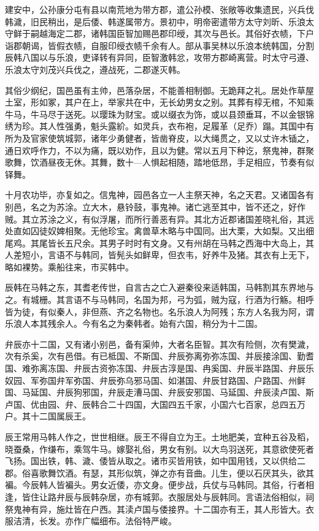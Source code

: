 \documentclass[12pt,UTF8]{ctexbook}
\begin{document}
建安中，公孙康分屯有县以南荒地为带方郡，遣公孙模、张敞等收集遗民，兴兵伐韩濊，旧民稍出，是后倭、韩遂属带方。景初中，明帝密遣带方太守刘昕、乐浪太守鲜于嗣越海定二郡，诸韩国臣智加赐邑郡印绶，其次与邑长。其俗好衣帻，下户诣郡朝谒，皆假衣帻，自服印绶衣帻千余有人。部从事吴林以乐浪本统韩国，分割辰韩八国以与乐浪，吏译转有异同，臣智激韩忿，攻带方郡崎离营。时太守弓遵、乐浪太守刘茂兴兵伐之，遵战死，二郡遂灭韩。

其俗少纲纪，国邑虽有主帅，邑落杂居，不能善相制御。无跪拜之礼。居处作草屋土室，形如冢，其户在上，举家共在中，无长幼男女之别。其葬有椁无棺，不知乘牛马，牛马尽于送死。以璎珠为财宝。或以缀衣为饰，或以县颈垂耳，不以金银锦绣为珍。其人性强勇，魁头露紒。如灵兵，衣布袍，足履革（足乔）蹋。其国中有所为及官家使筑城郭，诸年少勇健者，皆凿脊皮，以大绳贯之，又以丈许木锸之，通日欢呼作力，不以为痛，既以劝作，且以为健。常以五月下种讫，祭鬼神，群聚歌舞，饮酒昼夜无休。其舞，数十—人惧起相随，踏地低昂，手足相应，节奏有似铎舞。

十月农功毕，亦复如之。信鬼神，园邑各立一人主祭天神，名之天君。又诸国各有别邑，名之为苏涂。立大木，悬铃鼓，事鬼神。诸亡逃至其中，皆不还之，好作贼。其立苏涂之义，有似浮屠，而所行善恶有异。其北方近郡诸国差晓礼俗，其远处直如囚徒奴婢相聚。无他珍宝。禽兽草木略与中国同。出大栗，大如梨。又出细尾鸡。其尾皆长五尺余。其男子时时有文身。又有州胡在马韩之西海中大岛上，其人差短小，言语不与韩同，皆髡头如鲜卑，但衣韦，好养牛及猪。其衣有上无下，略如裸势。乘船往来，市买韩中。

辰韩在马韩之东，其耆老传世，自言古之亡入避秦役来适韩国，马韩割其东界地与之。有城栅。其言语不与马韩同，名国为邦，弓为弧，贼为寇，行酒为行觞。相呼皆为徒，有似秦人，非但燕、齐之名物也。名乐浪人为阿残；东方人名我为阿，谓乐浪人本其残余人。今有名之为秦韩者。始有六国，稍分为十二国。

弁辰亦十二国，又有诸小别邑，备有渠帅，大者名臣智。其次有险侧，次有樊濊，次有杀奚，次有邑借。有已柢国、不斯国、弁辰弥离弥弥冻国、并辰接涂国、勤耆国、难弥离冻国、弁辰古资弥冻国、弁辰古淳是国、冉奚国、弁辰半路国、弁辰乐奴园、军弥国弁军弥国、弁辰弥乌邪马国、如湛国、弁辰甘路国、户路国、州鲜国、马延国、弁辰狗邪国，弁辰走漕马国、弁辰安邪国、马延国、弁辰渎卢国、斯卢国、优由园、弁、辰韩合二十四国，大国四五千家，小国六七百家，总四五万户。其十二国属辰王。

辰王常用马韩人作之，世世相继。辰王不得自立为王。土地肥美，宜种五谷及稻，晓蚕桑，作缣布，乘驾牛马。嫁娶礼俗，男女有别。以大鸟羽送死，其意欲使死者飞扬。国出铁，韩、濊、倭皆从取之。诸市买皆用铁，如中国用钱，又以供给二郡。俗喜歌舞饮酒。有瑟，其形似筑，弹之亦有音曲。儿生，便以石厌其头，欲其褊。今辰韩人皆褊头。男女近倭，亦文身。便步战，兵仗与马韩同。其俗，行者相逢，皆住让路弁辰与辰韩杂居，亦有城郭。衣服居处与辰韩同。言语法俗相似，祠祭鬼神有异，施灶皆在户西。其渎卢国与倭接界。十二国亦有王，其人形皆大。衣服洁清，长发。亦作广幅细布。法俗特严峻。
\end{document}
